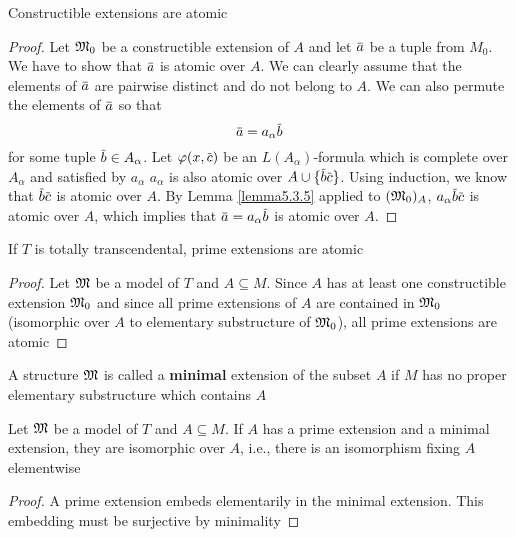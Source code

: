 \documentclass[11pt]{article}
\begin{document}
\begin{corollary}[]
Constructible extensions are atomic
\end{corollary}

\begin{proof}
Let \(\mathfrak{M}_0\) be a constructible extension of \(A\) and let \(\bara\) be a tuple from \(M_0\). We
have to show that \(\bara\) is atomic over \(A\). We can clearly assume that the elements
of \(\bara\) are pairwise distinct and do not belong to \(A\). We can also permute the elements
of \(\bara\) so that
\begin{equation*}
\bara=a_\alpha\barb
\end{equation*}
for some tuple \(\barb\in A_\alpha\). Let \(\varphi(x,\barc)\) be an \(L(A_\alpha)\)-formula which is complete
over \(A_\alpha\) and satisfied by \(a_\alpha\)
\(a_\alpha\) is also atomic over \(A\cup\{\barb\barc\}\). Using induction, we know
that \(\barb\barc\) is atomic over \(A\).
By Lemma \ref{lemma5.3.5} applied
to \((\mathfrak{M}_0)_A\), \(a_\alpha\barb\barc\) is atomic over \(A\), which implies that \(\bara=a_\alpha\barb\) is
atomic over \(A\).
\end{proof}

\begin{corollary}[]
\label{cor5.3.7}
If \(T\) is totally transcendental, prime extensions are atomic
\end{corollary}

\begin{proof}
Let \(\mathfrak{M}\) be a model of \(T\) and \(A\subseteq M\).  Since \(A\) has at least one constructible
extension \(\mathfrak{M}_0\) and since all prime extensions of \(A\) are contained in \(\mathfrak{M}_0\) (isomorphic
over \(A\) to elementary substructure of \(\mathfrak{M}_0\)), all prime extensions are atomic
\end{proof}

A structure \(\mathfrak{M}\) is called a \textbf{minimal} extension of the subset \(A\) if \(M\) has no proper
elementary substructure which contains \(A\)

\begin{lemma}[]
\label{lemma5.3.8}
Let \(\mathfrak{M}\) be a model of \(T\) and \(A\subseteq M\). If \(A\) has a prime extension and a minimal
extension, they are isomorphic over \(A\), i.e., there is an isomorphism fixing \(A\) elementwise
\end{lemma}

\begin{proof}
A prime extension embeds elementarily in the minimal extension. This embedding must be
surjective by minimality
\end{proof}
\end{document}

